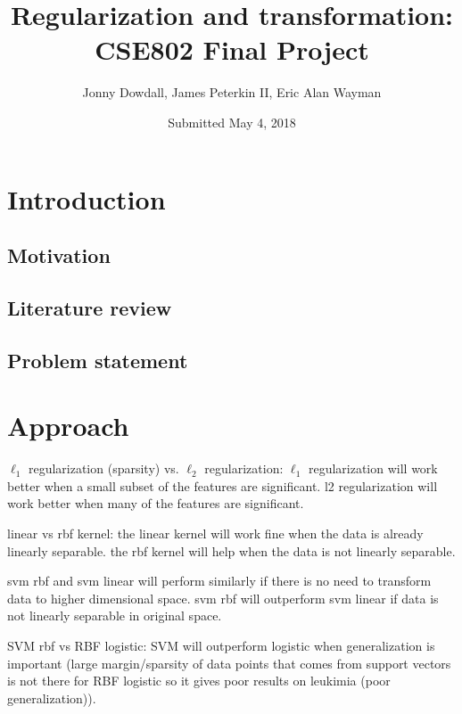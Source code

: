 \documentclass[letterpaper, 12pt]{article}
\begin{document}
\renewcommand{\arraystretch}{1.1}

\title{Regularization and transformation:\\CSE802 Final Project}
\author{Jonny Dowdall, James Peterkin II, Eric Alan Wayman}
\date{Submitted May 4, 2018}
\maketitle

\section{Introduction}

\subsection{Motivation}

\subsection{Literature review}

\subsection{Problem statement}

\section{Approach}

$\ell_1$ regularization (sparsity) vs. $\ell_2$ regularization: $\ell_1$ regularization will work better when a small subset of the features are significant. l2 regularization will work better when many of the features are significant.

linear vs rbf kernel: the linear kernel will work fine when the data is already linearly separable. the rbf kernel will help when the data is not linearly separable.

svm rbf and svm linear will perform similarly if there is no need to transform data to higher dimensional space. svm rbf will outperform svm linear if data is not linearly separable in original space.

SVM rbf vs RBF logistic: SVM will outperform logistic when generalization is important (large margin/sparsity of data points that comes from support vectors is not there for RBF logistic so it gives poor results on leukimia (poor generalization)).
\end{document}
